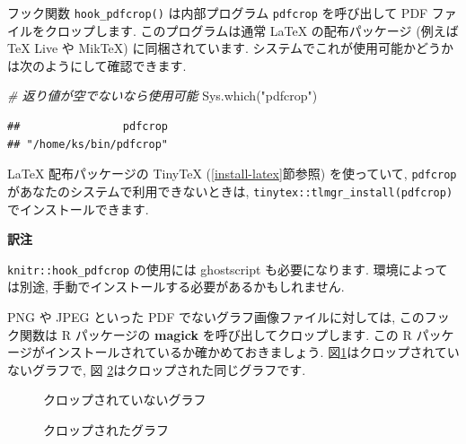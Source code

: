 \documentclass[
  11pt,
  lualatex,ja=standard,jafont=noto]{bxjsreport}
\newenvironment{Shaded}{\begin{snugshade}}{\end{snugshade}}
\newcommand{\CommentTok}[1]{\textcolor[rgb]{0.56,0.35,0.01}{\textit{#1}}}
\newcommand{\FunctionTok}[1]{\textcolor[rgb]{0.00,0.00,0.00}{#1}}
\newcommand{\NormalTok}[1]{#1}
\newcommand{\StringTok}[1]{\textcolor[rgb]{0.31,0.60,0.02}{#1}}
\newenvironment{infobox}[1]{\begin{itemize}\renewcommand{\labelitemi}{\raisebox{-.7\height}[0pt][0pt]{%
  {\setkeys{Gin}{width=3em,keepaspectratio}\texttt{[image: \_latex/\_img/\#1]}}}}
  \setlength{\fboxsep}{1em}
  \begin{greyblock}
  \item
  }{\end{greyblock}\end{itemize}
}
\begin{document}
フック関数 \texttt{hook\_pdfcrop()} は内部プログラム \texttt{pdfcrop} を呼び出して PDF ファイルをクロップします. このプログラムは通常 LaTeX の配布パッケージ (例えば TeX Live や MikTeX) に同梱されています. システムでこれが使用可能かどうかは次のようにして確認できます.

\begin{Shaded}
\begin{Highlighting}[numbers=left,,]
\CommentTok{\# 返り値が空でないなら使用可能}
\FunctionTok{Sys.which}\NormalTok{(}\StringTok{"pdfcrop"}\NormalTok{)}
\end{Highlighting}
\end{Shaded}

\begin{verbatim}
##                pdfcrop 
## "/home/ks/bin/pdfcrop"
\end{verbatim}

LaTeX 配布パッケージの TinyTeX (\ref{install-latex}節参照) を使っていて, \texttt{pdfcrop} があなたのシステムで利用できないときは, \texttt{tinytex::tlmgr\_install(\textquotesingle{}pdfcrop\textquotesingle{})} でインストールできます.

\begin{infobox}{memo}
\textbf{訳注}

\texttt{knitr::hook\_pdfcrop} の使用には ghostscript も必要になります. 環境によっては別途, 手動でインストールする必要があるかもしれません.

\end{infobox}

PNG や JPEG といった PDF でないグラフ画像ファイルに対しては, このフック関数は R パッケージの \textbf{magick} \autocite{R-magick}を呼び出してクロップします. この R パッケージがインストールされているか確かめておきましょう. 図\ref{fig:crop-no}はクロップされていないグラフで, 図 \ref{fig:crop-yes}はクロップされた同じグラフです.

\begin{figure}

{\centering {} 

}

\caption{クロップされていないグラフ}\label{fig:crop-no}
\end{figure}

\begin{figure}

{\centering {} 

}

\caption{クロップされたグラフ}\label{fig:crop-yes}
\end{figure}
\end{document}
